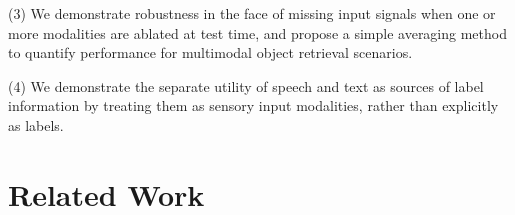 \documentclass[sigconf,natbib=true,anonymous=true]{acmart}
\newcommand{\todokdinline}[1]{\todo[color=red!20,inline]{{KD: \small #1}}}
\newcommand{\todocmi}[1]{\todo[inline,color=green!40]{\small #1 -- Cynthia}}
\newcommand{\todoffinline}[1]{\todo[inline,color=blue!20]{\small #1 -- Frank}}
\begin{document}
(3) We demonstrate robustness in the face of missing input signals when one or more modalities are ablated at test time, and propose a simple averaging method to quantify performance for multimodal object retrieval scenarios.
    
(4) We demonstrate the separate utility of speech and text as sources of label information by treating them as sensory input modalities, rather than explicitly as labels.
    




\section{Related Work}
\label{sec:Related-Work}

\end{document}
